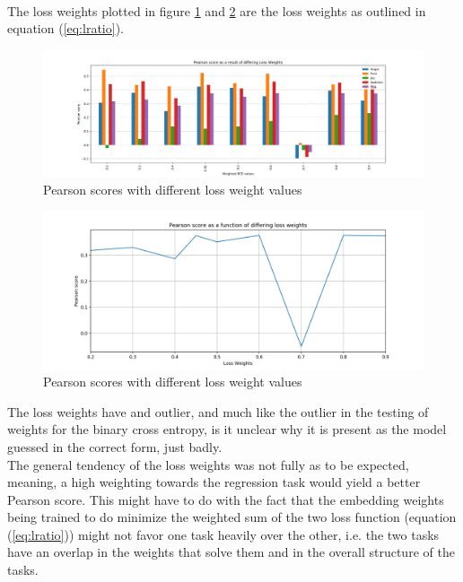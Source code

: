 \\
The loss weights plotted in figure \ref{fig:LWvalues} and \ref{fig:averageLW} are the loss weights as outlined in equation (\ref{eq:lratio}).
\begin{figure}[H]
    \centering
        \includegraphics[width=\textwidth]{pictures/LossWeightsvalues.png}
        \caption{Pearson scores with different loss weight values}
        \label{fig:LWvalues}
\end{figure}

\begin{figure}[H]
    \centering
        \includegraphics[width=\textwidth]{pictures/LossWeightsPlot.png}
        \caption{Pearson scores with different loss weight values}
        \label{fig:averageLW}
\end{figure}
The loss weights have and outlier, and much like the outlier in the testing of weights for the binary cross entropy, is it unclear why it is present as the model guessed in the correct form, just badly.\\
The general tendency of the loss weights was not fully as to be expected, meaning, a high weighting towards the regression task would yield a better Pearson score. This might have to do with the fact that the embedding weights being trained to do minimize the weighted sum of the two loss function (equation (\ref{eq:lratio})) might not favor one task heavily over the other, i.e. the two tasks have an overlap in the weights that solve them and in the overall structure of the tasks.

